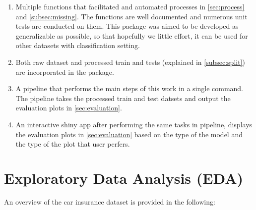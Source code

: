 \documentclass{article}
\begin{document}
\begin{enumerate}
\def\labelenumi{\arabic{enumi}.}
\item
  Multiple functions that facilitated and automated processes in
  \ref{sec:process} and \ref{subsec:missing}. The functions are well
  documented and numerous unit tests are conducted on them. This package
  was aimed to be developed as generalizable as possible, so that
  hopefully we little effort, it can be used for other datasets with
  classification setting.
\item
  Both raw dataset and processed train and tests (explained in
  \ref{subsec:split}) are incorporated in the package.
\item
  A pipeline that performs the main steps of this work in a single
  command. The pipeline takes the processed train and test datsets and
  output the evaluation plots in \ref{sec:evaluation}.
\item
  An interactive shiny app after performing the same tasks in pipeline,
  displays the evaluation plots in \ref{sec:evaluation} based on the
  type of the model and the type of the plot that user perfers.
\end{enumerate}

\hypertarget{exploratory-data-analysis-eda}{%
\section{\texorpdfstring{Exploratory Data Analysis (EDA)
\label{sec:data}}{Exploratory Data Analysis (EDA) }}\label{exploratory-data-analysis-eda}}

An overview of the car insurance dataset is provided in the following:
\tiny
\end{document}
